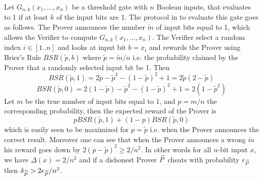 Let $G_{n,k}(x_1,\ldots,x_n)$ be a threshold gate with $n$ Boolean inputs, that evaluates to 1 if at least $k$ of the input bits are 1. The protocol in \cite{am1} to evaluate this gate goes as follows. The Prover announces the number $\tilde{m}$ of input bits equal to 1, which allows the Verifier to compute $G_{n,k}(x_1,\ldots,x_n)$. The Verifier select a random index $i \in [1..n]$ and looks at input bit $b=x_i$ and rewards the Prover using Brier's Rule $BSR(\tilde{p},b)$ where $\tilde{p}=\tilde{m}/n$ i.e. the probability claimed by the Prover that a randomly selected input bit be 1. Then
\[BSR(\tilde{p},1) = 2\tilde{p} - \tilde{p}^2 - (1-\tilde{p})^2 + 1 = 2\tilde{p}(2-\tilde{p}) \]
\[BSR(\tilde{p},0) = 2(1-\tilde{p}) - \tilde{p}^2 - (1-\tilde{p})^2 +1 = 2(1-\tilde{p}^2) \]
Let $m$ be the true number of input bits equal to 1, and $p=m/n$ the corresponding probability, then the expected reward of the Prover is
\begin{equation}
\label{eq:bsr}
p BSR(\tilde{p},1) + (1-p) BSR(\tilde{p},0) 
\end{equation}
which is easily seen to be maximized for $p=\tilde{p}$ i.e. when the Prover announces the correct result. Moreover one can see that when the Prover announces a wrong $\tilde{m}$ his reward goes down by $2(p-\tilde{p})^2 \geq 2/n^2$. In other words 
for all $n$-bit input $x$, we have $\Delta(x)=2/n^2$ and if a dishonest Prover $\widetilde{P}$ cheats with probability $\epsilon_{\widetilde{P}}$ then $\delta_{\widetilde{P}} > 2\epsilon_{\widetilde{P}}/n^2$. 




